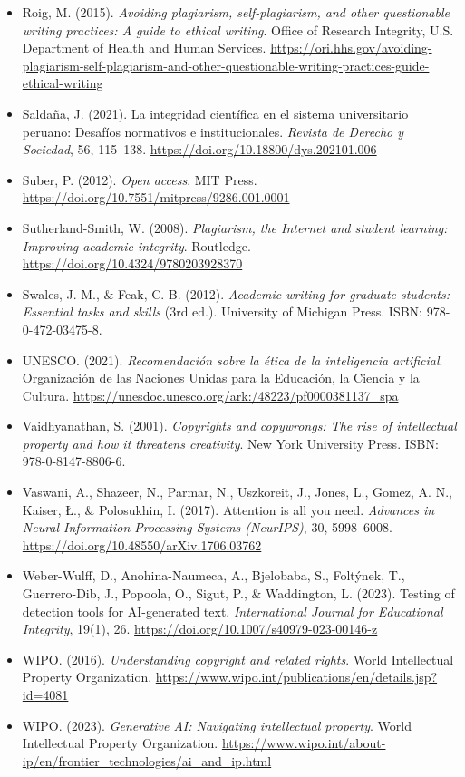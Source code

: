 \begin{itemize}[leftmargin=1.5em, label={}, itemsep=0.22ex, parsep=0pt]
\item Roig, M. (2015). \textit{Avoiding plagiarism, self-plagiarism, and other questionable writing practices: A guide to ethical writing}. Office of Research Integrity, U.S. Department of Health and Human Services. \url{https://ori.hhs.gov/avoiding-plagiarism-self-plagiarism-and-other-questionable-writing-practices-guide-ethical-writing}
\item Saldaña, J. (2021). La integridad científica en el sistema universitario peruano: Desafíos normativos e institucionales. \textit{Revista de Derecho y Sociedad}, 56, 115--138. \url{https://doi.org/10.18800/dys.202101.006}
\item Suber, P. (2012). \textit{Open access}. MIT Press. \url{https://doi.org/10.7551/mitpress/9286.001.0001}
\item Sutherland-Smith, W. (2008). \textit{Plagiarism, the Internet and student learning: Improving academic integrity}. Routledge. \url{https://doi.org/10.4324/9780203928370}
\item Swales, J. M., \& Feak, C. B. (2012). \textit{Academic writing for graduate students: Essential tasks and skills} (3rd ed.). University of Michigan Press. ISBN: 978-0-472-03475-8.
\item UNESCO. (2021). \textit{Recomendación sobre la ética de la inteligencia artificial}. Organización de las Naciones Unidas para la Educación, la Ciencia y la Cultura. \url{https://unesdoc.unesco.org/ark:/48223/pf0000381137_spa}
\item Vaidhyanathan, S. (2001). \textit{Copyrights and copywrongs: The rise of intellectual property and how it threatens creativity}. New York University Press. ISBN: 978-0-8147-8806-6.
\item Vaswani, A., Shazeer, N., Parmar, N., Uszkoreit, J., Jones, L., Gomez, A. N., Kaiser, \L., \& Polosukhin, I. (2017). Attention is all you need. \textit{Advances in Neural Information Processing Systems (NeurIPS)}, 30, 5998--6008. \url{https://doi.org/10.48550/arXiv.1706.03762}
\item Weber-Wulff, D., Anohina-Naumeca, A., Bjelobaba, S., Foltýnek, T., Guerrero-Dib, J., Popoola, O., Sigut, P., \& Waddington, L. (2023). Testing of detection tools for AI-generated text. \textit{International Journal for Educational Integrity}, 19(1), 26. \url{https://doi.org/10.1007/s40979-023-00146-z}
\item WIPO. (2016). \textit{Understanding copyright and related rights}. World Intellectual Property Organization. \url{https://www.wipo.int/publications/en/details.jsp?id=4081}
\item WIPO. (2023). \textit{Generative AI: Navigating intellectual property}. World Intellectual Property Organization. \url{https://www.wipo.int/about-ip/en/frontier_technologies/ai_and_ip.html}
\end{itemize}
